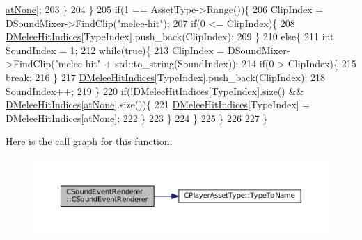 \begin{DoxyCode}
      \hyperlink{GameDataTypes_8h_a5600d4fc433b83300308921974477feca82fb51718e2c00981a2d37bc6fe92593}{atNone}];
203             \}
204         \}
205         \textcolor{keywordflow}{if}(1 == AssetType->Range())\{
206             ClipIndex = \hyperlink{classCSoundEventRenderer_a5abf598a7e8783d9cc78e0d33a65c9c2}{DSoundMixer}->FindClip(\textcolor{stringliteral}{"melee-hit"});
207             \textcolor{keywordflow}{if}(0 <= ClipIndex)\{
208                 \hyperlink{classCSoundEventRenderer_a54a3a8f6a91adcaa81faa779772622da}{DMeleeHitIndices}[TypeIndex].push\_back(ClipIndex);
209             \}
210             \textcolor{keywordflow}{else}\{
211                 \textcolor{keywordtype}{int} SoundIndex = 1;
212                 \textcolor{keywordflow}{while}(\textcolor{keyword}{true})\{
213                     ClipIndex = \hyperlink{classCSoundEventRenderer_a5abf598a7e8783d9cc78e0d33a65c9c2}{DSoundMixer}->FindClip(\textcolor{stringliteral}{"melee-hit"} + std::to\_string(SoundIndex));
214                     \textcolor{keywordflow}{if}(0 > ClipIndex)\{
215                         \textcolor{keywordflow}{break};   
216                     \}
217                     \hyperlink{classCSoundEventRenderer_a54a3a8f6a91adcaa81faa779772622da}{DMeleeHitIndices}[TypeIndex].push\_back(ClipIndex);
218                     SoundIndex++;
219                 \}
220                 \textcolor{keywordflow}{if}(!\hyperlink{classCSoundEventRenderer_a54a3a8f6a91adcaa81faa779772622da}{DMeleeHitIndices}[TypeIndex].size() && 
      \hyperlink{classCSoundEventRenderer_a54a3a8f6a91adcaa81faa779772622da}{DMeleeHitIndices}[\hyperlink{GameDataTypes_8h_a5600d4fc433b83300308921974477feca82fb51718e2c00981a2d37bc6fe92593}{atNone}].size())\{
221                     \hyperlink{classCSoundEventRenderer_a54a3a8f6a91adcaa81faa779772622da}{DMeleeHitIndices}[TypeIndex] = 
      \hyperlink{classCSoundEventRenderer_a54a3a8f6a91adcaa81faa779772622da}{DMeleeHitIndices}[\hyperlink{GameDataTypes_8h_a5600d4fc433b83300308921974477feca82fb51718e2c00981a2d37bc6fe92593}{atNone}];
222                 \}
223             \}
224         \}
225     \}
226     
227 \}
\end{DoxyCode}
Here is the call graph for this function\+:\nopagebreak
\begin{figure}[H]
\begin{center}
\leavevmode
\includegraphics[width=350pt]{classCSoundEventRenderer_a2a1c105a120bebf386b772a06c2a053a_cgraph}
\end{center}
\end{figure}



